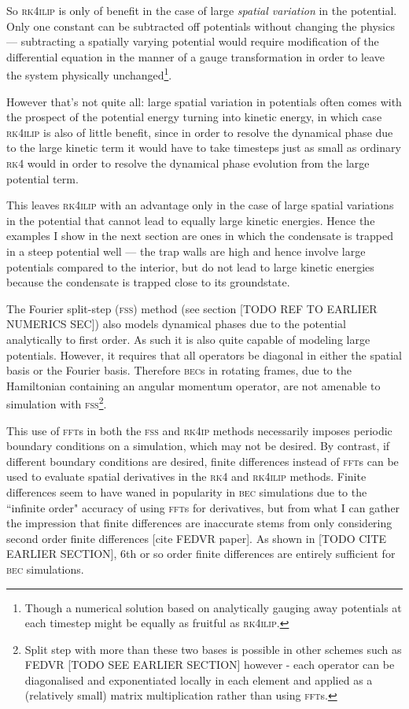 So \textsc{rk4ilip} is only of benefit in the case of large \emph{spatial variation} in the potential. Only one constant can be subtracted off potentials without changing the physics --- subtracting a spatially varying potential would require modification of the differential equation in the manner of a gauge transformation in order to leave the system physically unchanged\footnote{Though a numerical solution based on analytically gauging away potentials at each timestep might be equally as fruitful as \textsc{rk4ilip}.}.

However that's not quite all: large spatial variation in potentials often comes with the prospect of the potential energy turning into kinetic energy, in which case \textsc{rk4ilip} is also of little benefit, since in order to resolve the dynamical phase due to the large kinetic term it would have to take timesteps just as small  as ordinary \textsc{rk4} would in order to resolve the dynamical phase evolution from the large potential term.

This leaves \textsc{rk4ilip} with an advantage only in the case of large spatial variations in the potential that cannot lead to equally large kinetic energies. Hence the examples I show in the next section are ones in which the condensate is trapped in a steep potential well --- the trap walls are high and hence involve large potentials compared to the interior, but do not lead to large kinetic energies because the condensate is trapped close to its groundstate.

The Fourier split-step (\textsc{fss}) method (see section [TODO REF TO EARLIER NUMERICS SEC]) also models dynamical phases due to the potential analytically to first order. As such it is also quite capable of modeling large potentials. However, it requires that all operators be diagonal in either the spatial basis or the Fourier basis. Therefore \textsc{bec}s in rotating frames, due to the Hamiltonian containing an angular momentum operator, are not amenable to simulation with \textsc{fss}\footnote{Split step with more than these two bases is possible in other schemes such as \textsc{FEDVR} [TODO SEE EARLIER SECTION] however - each operator can be diagonalised and exponentiated locally in each element and applied as a (relatively small) matrix multiplication rather than using \textsc{fft}s.}.

This use of \textsc{fft}s in both the \textsc{fss} and \textsc{rk4ip} methods necessarily imposes periodic boundary conditions on a simulation, which may not be desired. By contrast, if different boundary conditions are desired, finite differences instead of \textsc{fft}s can be used to evaluate spatial derivatives in the \textsc{rk4} and \textsc{rk4ilip} methods. Finite differences seem to have waned in popularity in \textsc{bec} simulations due to the ``infinite order" accuracy of using \textsc{fft}s for derivatives, but from what I can gather the impression that finite differences are inaccurate stems from only considering second order finite differences [cite FEDVR paper]. As shown in [TODO CITE EARLIER SECTION], 6th or so order finite differences are entirely sufficient for \textsc{bec} simulations.


